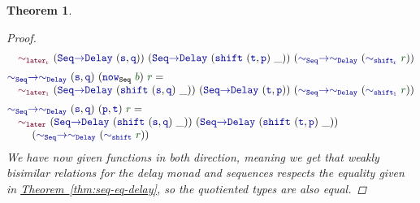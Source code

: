 \documentclass[twoside,11pt,openright]{report}
\theoremstyle{plain} %
\newtheorem{thm}{Theorem}[section]
\theoremstyle{definition}
\theoremstyle{remark}
\newcommand*{\thmref}[1]{\hyperref[thm:#1]{Theorem~\ref*{thm:#1}}} %
\newcommand*{\term}[1]{\textcolor{green!30!black}{#1}} %
\newcommand*{\function}[1]{\textcolor{blue!60!black}{\ensuremath{\mathtt{#1}}}}
\newcommand*{\constructor}[1]{\textcolor{purple!60!black}{\ensuremath{\mathtt{#1}}}}
\begin{document}
\begin{thm}
\begin{proof}
\begin{equation}
\begin{aligned}
        &\quad\constructor{\sim_{later_r}}~(\function{Seq{\rightarrow}Delay}~(\function{s},\function{q}))~(\function{Seq{\rightarrow}Delay}~(\function{shift}~(\function{t},\function{p})~\_))~(\function{{\sim}_{Seq}{\rightarrow}{\sim}_{Delay}}~(\function{\sim_{shift_r}}~\term{r})) \\[1mm]
        &\function{{\sim}_{Seq}{\rightarrow}{\sim}_{Delay}}~(\function{s},\function{q})~(\function{now}_{\mathtt{Seq}}~\term{b})~\term{r} = \\[-1mm]
        &\quad\constructor{\sim_{later_l}}~(\function{Seq{\rightarrow}Delay}~(\function{shift}~(\function{s},\function{q})~\_))~(\function{Seq{\rightarrow}Delay}~(\function{t},\function{p}))~(\function{{\sim}_{Seq}{\rightarrow}{\sim}_{Delay}}~(\function{\sim_{shift_l}}~\term{r})) \\[1mm]
        &\function{{\sim}_{Seq}{\rightarrow}{\sim}_{Delay}}~(\function{s},\function{q})~(\function{p},\function{t})~\term{r} = \\[-1mm]
        &\quad\constructor{\sim_{later}}~(\function{Seq{\rightarrow}Delay}~(\function{shift}~(\function{s},\function{q})~\_))~(\function{Seq{\rightarrow}Delay}~(\function{shift}~(\function{t},\function{p})~\_))\\[-1mm]
        &\quad\quad~(\function{{\sim}_{Seq}{\rightarrow}{\sim}_{Delay}}~(\function{\sim_{shift}}~\term{r}))
    \end{aligned}
  \end{equation}
  We have now given functions in both direction, meaning we get that weakly bisimilar relations for the delay monad and sequences respects the equality given in \thmref{seq-eq-delay}, so the quotiented types are also equal.
  \end{proof}
\end{thm}
\end{document}
